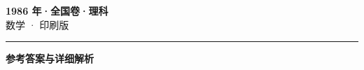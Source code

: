 \documentclass[zihao=5, a4paper]{ctexart}
\begin{document}
\begin{center}
  {\Large\bfseries 1986 年·全国卷·理科}\\[4pt]
  {\large 数学 · 印刷版}
\end{center}
\medskip
{}

\par\bigskip\hrule\bigskip
{}
\begin{center}{\large\bfseries 参考答案与详细解析}\end{center}
\smallskip

\end{document}
